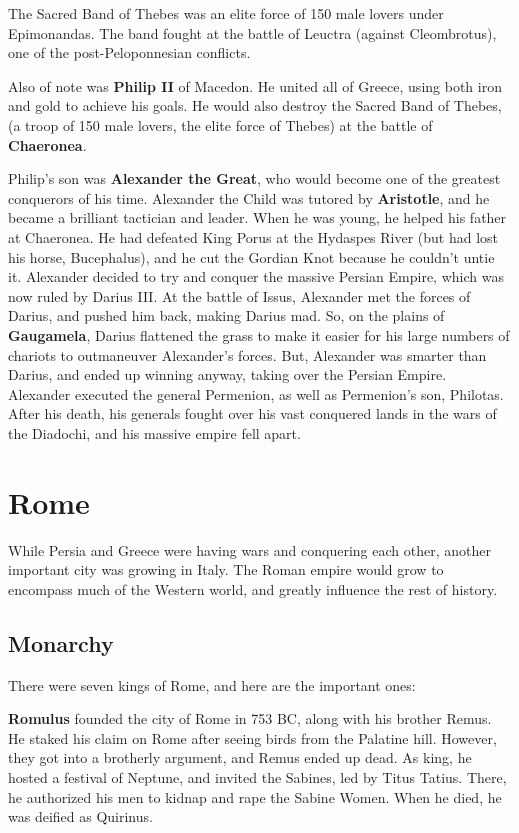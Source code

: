 The Sacred Band of Thebes was an elite force of 150 male lovers under Epimonandas.
The band fought at the battle of Leuctra (against Cleombrotus), one of the post-Peloponnesian conflicts.

Also of note was \textbf{Philip II} of Macedon.
He united all of Greece, using both iron and gold to achieve his goals.
He would also destroy the Sacred Band of Thebes, (a troop of 150 male lovers, the elite force of Thebes)
at the battle of \textbf{Chaeronea}.

Philip's son was \textbf{Alexander the Great}, who would become one of the greatest conquerors of his time.
Alexander the Child was tutored by \textbf{Aristotle}, and he became a brilliant tactician and leader.
When he was young, he helped his father at Chaeronea.
He had defeated King Porus at the Hydaspes River (but had lost his horse, Bucephalus),
and he cut the Gordian Knot because he couldn't untie it.
Alexander decided to try and conquer the massive Persian Empire, which was now ruled by Darius III\@.
At the battle of Issus, Alexander met the forces of Darius, and pushed him back, making Darius mad.
So, on the plains of \textbf{Gaugamela}, Darius flattened the grass to make it easier for his
large numbers of chariots to outmaneuver Alexander's forces.
But, Alexander was smarter than Darius, and ended up winning anyway, taking over the Persian Empire.
Alexander executed the general Permenion, as well as Permenion's son, Philotas.
After his death, his generals fought over his vast conquered lands in the wars of the Diadochi,
and his massive empire fell apart.

\section{Rome}

While Persia and Greece were having wars and conquering each other, another important city was growing in Italy.
The Roman empire would grow to encompass much of the Western world,
and greatly influence the rest of history.

\subsection*{Monarchy}

There were seven kings of Rome, and here are the important ones:

\textbf{Romulus} founded the city of Rome in 753 BC, along with his brother Remus.
He staked his claim on Rome after seeing birds from the Palatine hill.
However, they got into a brotherly argument, and Remus ended up dead.
As king, he hosted a festival of Neptune, and invited the Sabines, led by Titus Tatius.
There, he authorized his men to kidnap and rape the Sabine Women.
When he died, he was deified as Quirinus.

